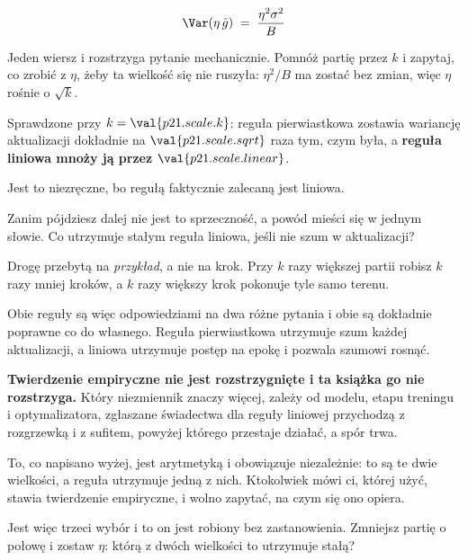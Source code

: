 \begin{fr}
\begin{ansblock}
\[ \Var(\eta\,\hat g) \;=\; \frac{\eta^{2}\sigma^{2}}{B} \]
\end{ansblock}

Jeden wiersz i rozstrzyga pytanie mechanicznie. Pomnóż partię przez $k$ i
zapytaj, co zrobić z $\eta$, żeby ta wielkość się nie ruszyła: $\eta^{2}/B$ ma
zostać bez zmian, więc $\eta$ rośnie o $\sqrt{k}$.

Sprawdzone przy $k = \val{p21.scale.k}$: reguła pierwiastkowa zostawia
wariancję aktualizacji dokładnie na $\val{p21.scale.sqrt}$ raza tym, czym była,
a \textbf{reguła liniowa mnoży ją przez $\val{p21.scale.linear}$}.
\end{fr}

\begin{fr}
Jest to niezręczne, bo regułą faktycznie zalecaną jest liniowa.

Zanim pójdziesz dalej \dash{} nie jest to sprzeczność, a powód mieści się w
jednym słowie. Co utrzymuje stałym reguła liniowa, jeśli nie szum w
aktualizacji?
\nextframe
\end{fr}

\begin{fr}
\begin{ansblock}
Drogę przebytą na \emph{przykład}, a nie na krok. Przy $k$ razy większej partii
robisz $k$ razy mniej kroków, a $k$ razy większy krok pokonuje tyle samo
terenu.
\end{ansblock}

Obie reguły są więc odpowiedziami na dwa różne pytania i obie są dokładnie
poprawne co do własnego. Reguła pierwiastkowa utrzymuje szum każdej
aktualizacji, a liniowa utrzymuje postęp na epokę i pozwala szumowi rosnąć.

\begin{warning}
\textbf{Twierdzenie empiryczne nie jest rozstrzygnięte i ta książka go nie
rozstrzyga.} Który niezmiennik znaczy więcej, zależy od modelu, etapu treningu
i optymalizatora, zgłaszane świadectwa dla reguły liniowej przychodzą z
rozgrzewką i z sufitem, powyżej którego przestaje działać, a spór trwa.

To, co napisano wyżej, jest arytmetyką i obowiązuje niezależnie: to są te dwie
wielkości, a reguła utrzymuje jedną z nich. Ktokolwiek mówi ci, której użyć,
stawia twierdzenie empiryczne, i wolno zapytać, na czym się ono opiera.
\end{warning}

Jest więc trzeci wybór i to on jest robiony bez zastanowienia. Zmniejsz partię
o połowę i zostaw $\eta$: którą z dwóch wielkości to utrzymuje stałą?
\nextframe
\end{fr}


